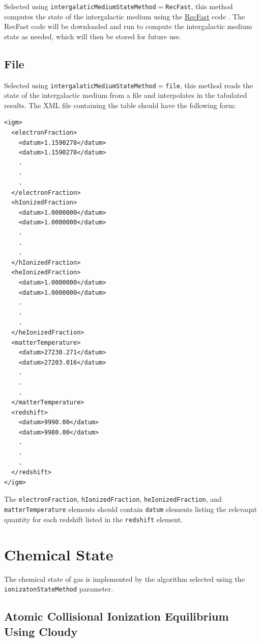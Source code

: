 Selected using {\tt intergalaticMediumStateMethod}$=${\tt RecFast}, this method computes the state of the intergalactic medium using the \href{http://www.astro.ubc.ca/people/scott/recfast.html}{{\sc RecFast}} code \cite{seager_how_2000,wong_how_2008}. The {\sc RecFast} code will be downloaded and run to compute the intergalactic medium state as needed, which will then be stored for future use.

\subsection{File}\label{phys:intergalacticMediumState:intergalacticMediumStateFile}

Selected using {\tt intergalaticMediumStateMethod}$=${\tt file}, this method reads the state of the intergalactic medium from a file and interpolates in the tabulated results. The XML file containing the table should have the following form:
 \begin{verbatim}
<igm>
  <electronFraction>
    <datum>1.1590278</datum>
    <datum>1.1590278</datum>
    .
    .
    .
  </electronFraction>
  <hIonizedFraction>
    <datum>1.0000000</datum>
    <datum>1.0000000</datum>
    .
    .
    .
  </hIonizedFraction>
  <heIonizedFraction>
    <datum>1.0000000</datum>
    <datum>1.0000000</datum>
    .
    .
    .
  </heIonizedFraction>
  <matterTemperature>
    <datum>27230.271</datum>
    <datum>27203.016</datum>
    .
    .
    .
  </matterTemperature>
  <redshift>
    <datum>9990.00</datum>
    <datum>9980.00</datum>
    .
    .
    .
  </redshift>
</igm>
 \end{verbatim}
 The {\tt electronFraction}, {\tt hIonizedFraction}, {\tt heIonizedFraction}, and {\tt matterTemperature} elements should contain {\tt datum} elements listing the relevaqnt quantity for each redshift listed in the {\tt redshift} element.

\section{Chemical State}\label{sec:ChemicalStateMethod}

The chemical state of gas is implemented by the algorithm selected using the {\tt ionizatonStateMethod} parameter.

\subsection{Atomic Collisional Ionization Equilibrium Using {\sc Cloudy}}


